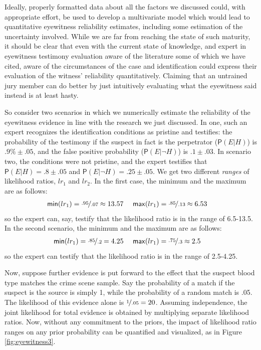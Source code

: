 \documentclass[
  10pt,
  dvipsnames,enabledeprecatedfontcommands]{scrartcl}
\newcommand{\n}{\neg}
\newcommand{\pr}[1]{\mathsf{P}(#1)}
\begin{document}
Ideally, properly formatted data about all the factors we discussed
could, with appropriate effort, be used to develop a multivariate model
which would lead to quantitative eyewitness reliability estimates,
including some estimation of the uncertainty involved. While we are far
from reaching the state of such maturity, it should be clear that even
with the current state of knowledge, and expert in eyewitness testimony
evaluation aware of the literature some of which we have cited, aware of
the circumstances of the case and identification could express their
evaluation of the witness' reliability quantitatively. Claiming that an
untrained jury member can do better by just intuitively evaluating what
the eyewitness said instead is at least hasty.

So consider two scenarios in which we numerically estimate the
reliability of the eyewitness evidence in line with the research we just
discussed. In one, such an expert recognizes the identification
conditions as pristine and testifies: the probability of the testimony
if the suspect in fact is the perpetrator (\(\pr{E\vert H}\)) is
\(.9\% \pm .05\), and the false positive probability
(\(\pr{E \vert \n H}\)) is \(.1\pm .03\). In scenario two, the
conditions were not pristine, and the expert testifies that
\(\pr{E\vert H}=.8 \pm .05\) and \(\pr{E\vert \n H}=.25 \pm .05\). We
get two different \emph{ranges} of likelihood ratios, \(lr_1\) and
\(lr_2\). In the first case, the minimum and the maximum are as follows:
\begin{align*}
\mathsf{min}(lr_1) = \nicefrac{.95}{.07} \approx 13.57  & \,\,\,\,\,\,\,\,  \mathsf{max}(lr_1) = \nicefrac{.85}{.13} \approx 6.53  
\end{align*} \noindent so the expert can, say, testify that the
likelihood ratio is in the range of 6.5-13.5. In the second scenario,
the minimum and the maximum are as follows: \begin{align*}
\mathsf{min}(lr_1) = \nicefrac{.85}{.2} =  4.25 &  \,\,\,\,\,\,\,\,   \mathsf{max}(lr_1) = \nicefrac{.75}{.3} \approx 2.5  
\end{align*} \noindent so the expert can testify that the likelihood
ratio is in the range of 2.5-4.25.

Now, suppose further evidence is put forward to the effect that the
suspect blood type matches the crime scene sample. Say the probability
of a match if the suspect is the source is simply 1, while the
probability of a random match is .05. The likelihood of this evidence
alone is \(\nicefrac{1}{.05}= 20\). Assuming independence, the joint
likelihood for total evidence is obtained by multiplying separate
likelihood ratios. Now, without any commitment to the priors, the impact
of likelihood ratio ranges on any prior probability can be quantified
and visualized, as in Figure \ref{fig:eyewitness3}.
\end{document}
